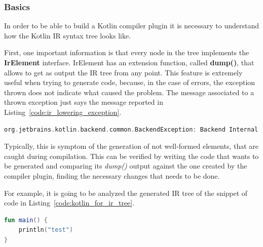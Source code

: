 \subsubsection{Basics}\label{section:compiler_plugin_basics}
In order to be able to build a Kotlin compiler plugin it is necessary to understand how the Kotlin IR syntax tree looks like.

First, one important information is that every node in the tree implements the \textbf{IrElement} interface. IrElement has an extension function, called \textbf{dump()}, that allows to get as output the IR tree from any point.\newline
This feature is extremely useful when trying to generate code, because, in the case of errors, the exception thrown does not indicate what caused the problem.\newline
The message associated to a thrown exception just says the message reported in Listing~\ref{code:ir_lowering_exception}.
\begin{lstlisting}[caption={Kotlin IR lowering Exception}, language=Kotlin, captionpos=b, label={code:ir_lowering_exception}]
org.jetbrains.kotlin.backend.common.BackendException: Backend Internal error: Exception during IR lowering
\end{lstlisting}
Typically, this is symptom of the generation of not well-formed elements, that are caught during compilation. This can be verified by writing the code that wants to be generated and comparing its \textit{dump()} output against the one created by the compiler plugin, finding the necessary changes that needs to be done.

For example, it is going to be analyzed the generated IR tree of the snippet of code in Listing~\ref{code:kotlin_for_ir_tree}.
\begin{lstlisting}[caption={Kotlin basic code to demostrate the Kotlin IR representation}, language=Kotlin, captionpos=b, label={code:kotlin_for_ir_tree}]
fun main() {
    println("test")
}
\end{lstlisting}

